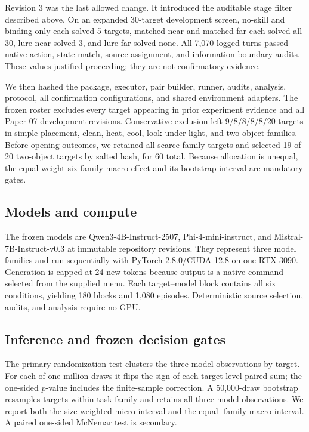 \documentclass[10pt]{article}
\begin{document}
Revision 3 was the last allowed change. It introduced the auditable stage filter
described above. On an expanded 30-target development screen, no-skill and
binding-only each solved 5 targets, matched-near and matched-far each solved all
30, lure-near solved 3, and lure-far solved none. All 7,070 logged turns passed
native-action, state-match, source-assignment, and information-boundary audits.
These values justified proceeding; they are not confirmatory evidence.

We then hashed the package, executor, pair builder, runner, audits, analysis,
protocol, all confirmation configurations, and shared environment adapters.
The frozen roster excludes every target appearing in prior experiment evidence
and all Paper 07 development revisions. Conservative exclusion left
9/8/8/8/8/20 targets in simple placement, clean, heat, cool, look-under-light,
and two-object families. Before opening outcomes, we retained all scarce-family
targets and selected 19 of 20 two-object targets by salted hash, for 60 total.
Because allocation is unequal, the equal-weight six-family macro effect and its
bootstrap interval are mandatory gates.

\subsection{Models and compute}
The frozen models are Qwen3-4B-Instruct-2507, Phi-4-mini-instruct, and
Mistral-7B-Instruct-v0.3 at immutable repository revisions. They represent
three model families and run sequentially with PyTorch 2.8.0/CUDA 12.8 on one
RTX 3090. Generation is capped at 24 new tokens because output is a native
command selected from the supplied menu. Each target--model block contains all
six conditions, yielding 180 blocks and 1,080 episodes. Deterministic source
selection, audits, and analysis require no GPU.

\subsection{Inference and frozen decision gates}
The primary randomization test clusters the three model observations by target.
For each of one million draws it flips the sign of each target-level paired sum;
the one-sided $p$-value includes the finite-sample correction. A 50,000-draw
bootstrap resamples targets within task family and retains all three model
observations. We report both the size-weighted micro interval and the equal-
family macro interval. A paired one-sided McNemar test is secondary.
\end{document}

